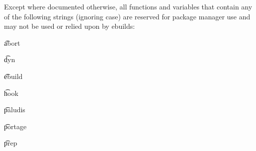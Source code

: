 Except where documented otherwise, all functions and variables that contain any of the following
strings (ignoring case) are reserved for package manager use and may not be used or relied upon by
ebuilds:

\begin{compactitem}
\item \t{abort}
\item \t{dyn}
\item \t{ebuild}
\item \t{hook}
\item \t{paludis}
\item \t{portage}
\item \t{prep}
\end{compactitem}


